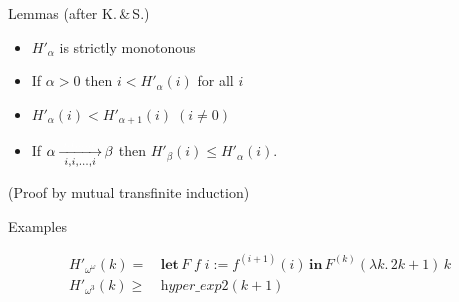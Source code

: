 \documentclass[10pt, fleqn]{beamer}
\begin{document}


\begin{frame}[fragile, label={fgflemmas}]

\begin{block}{Lemmas (after K.\,\&\,S.)}
   \begin{itemize} 
    \item \textcolor{mathcolor}{$H'_\alpha$} is strictly monotonous
    
     \item  If $\alpha>0$ then \textcolor{mathcolor}{$ i < H'_\alpha(i)$} for all $i$
    
    \item   $H'_\alpha(i) < H'_{\alpha+1}(i) \; (i \not=0)$
    
       \item     If \textcolor{mathcolor}{$\alpha \rplus{i,i,\dots,i} \beta$} then \textcolor{mathcolor}{$H'_\beta(i)\leq H'_\alpha(i)$}.
         

       \end{itemize}
       (Proof by mutual transfinite induction)
 \end{block}  

 \begin{block}{Examples}
         
      {\color{mathcolor}
      
        \begin{align*}
        H'_{\omega^\omega}(k)=\,& \textbf{let}\,F\;f\;i := f^{(i+1)}(i)\,
                                  \textbf{in}\, F^{(k)}(\lambda k.\,2k+1)\,k\\
      H'_{\omega^3}(k) \geq\, & \textit{hyper\_exp2}(k+1) \\
    \end{align*}
       }%
  \end{block}
  
    
\end{frame}
 



\end{document}
